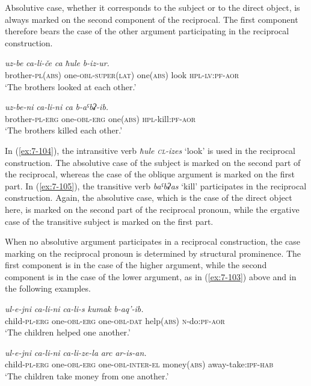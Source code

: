 ﻿\documentclass[output=paper]{langsci/langscibook}
\begin{document}
Absolutive case, whether it corresponds to the subject or to the direct
object, is always marked on the second component of the reciprocal. The
first component therefore bears the case of the other argument
participating in the reciprocal construction.


\ea\label{ex:7-104}
\gll \emph{uz-be} \emph{ca-li-če} \emph{ca} \emph{ħule} \emph{b-iz-ur.}\\
brother-\textsc{pl}(\textsc{abs}) one-\textsc{obl}-\textsc{super(lat)} one(\textsc{abs}) look \textsc{hpl}-\textsc{lv}:\textsc{pf}-\textsc{aor}\\
\glt `The brothers looked at each other.'

\ex\label{ex:7-105}
\gll \emph{uz-be-ni} \emph{ca-li-ni} \emph{ca} \emph{b-aˤbʡ-ib.}\\
brother-\textsc{pl}-\textsc{erg} one-\textsc{obl}-\textsc{erg} one(\textsc{abs}) \textsc{hpl}-kill:\textsc{pf}-\textsc{aor}\\
\glt `The brothers killed each other.'
\z

In (\ref{ex:7-104}), the intransitive verb \emph{ħule \textup{\textsc{cl}}-izes} `look' is used in the
reciprocal construction. The absolutive case of the subject is marked on
the second part of the reciprocal, whereas the case of the oblique
argument is marked on the first part. In (\ref{ex:7-105}), the transitive verb
\emph{baˤbʡas} `kill' participates in the reciprocal construction.
Again, the absolutive case, which is the case of the direct object here,
is marked on the second part of the reciprocal pronoun, while the
ergative case of the transitive subject is marked on the first part.

When no absolutive argument participates in a reciprocal construction,
the case marking on the reciprocal pronoun is determined by structural
prominence. The first component is in the case of the higher argument,
while the second component is in the case of the lower argument, as in
(\ref{ex:7-103}) above and in the following examples.

\ea\label{ex:7-106}
\gll \emph{ul-e-jni} \emph{ca-li-ni} \emph{ca-li-s} \emph{kumak} \emph{b-aq'-ib.}\\
child-\textsc{pl}-\textsc{erg} one-\textsc{obl}-\textsc{erg} one-\textsc{obl}-\textsc{dat} help(\textsc{abs}) \textsc{n}-do:\textsc{pf}-\textsc{aor}\\
\glt `The children helped one another.'

\ex \label{ex:7-107}
\gll \emph{ul-e-jni} \emph{ca-li-ni} \emph{ca-li-ze-la} \emph{arc} \emph{ar-is-an.}\\
child-\textsc{pl}-\textsc{erg} one-\textsc{obl}-\textsc{erg} one-\textsc{obl}-\textsc{inter}-\textsc{el} money(\textsc{abs}) away-take:\textsc{ipf}-\textsc{hab}\\
\glt `The children take money from one another.'
\z
\end{document}
